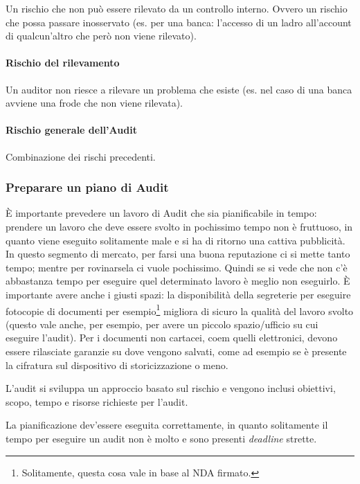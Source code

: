 Un rischio che non può essere rilevato da un controllo interno. Ovvero un 
rischio che possa passare inosservato (es. per una banca: l'accesso di un ladro 
all'account di qualcun'altro che però non viene rilevato).


\paragraph*{Rischio del rilevamento}

Un auditor non riesce a rilevare un problema che esiste (es. nel caso 
di una banca avviene una frode che non viene rilevata).

\paragraph*{Rischio generale dell'Audit}

Combinazione dei rischi precedenti.


\subsubsection{Preparare un piano di Audit}

È importante prevedere un lavoro di Audit che sia pianificabile in tempo: 
prendere un lavoro che deve essere svolto in pochissimo tempo non è 
fruttuoso, in quanto viene eseguito solitamente male e si ha di 
ritorno una cattiva pubblicità. In questo segmento di mercato, per farsi una buona 
reputazione ci si mette tanto tempo; mentre per rovinarsela ci vuole pochissimo. 
Quindi se si vede che non c'è abbastanza tempo per eseguire quel determinato 
lavoro è meglio non eseguirlo. 
È importante avere anche i giusti spazi: la disponibilità della segreterie per 
eseguire fotocopie di documenti per esempio\footnote{Solitamente, questa cosa 
vale in base al NDA firmato.} migliora di sicuro la qualità del lavoro svolto 
(questo vale anche, per esempio, per avere un piccolo spazio/ufficio su cui 
eseguire l'audit). Per i documenti non cartacei, coem quelli elettronici, 
devono essere rilasciate garanzie su dove vengono salvati, come ad esempio se è 
presente la cifratura sul dispositivo di storicizzazione o meno.

L'audit si sviluppa un approccio basato sul rischio e vengono inclusi 
obiettivi, scopo, tempo e risorse richieste per l'audit.

La pianificazione dev'essere eseguita correttamente, in quanto solitamente il 
tempo per eseguire un audit non è molto e sono presenti \textit{deadline} 
strette.

